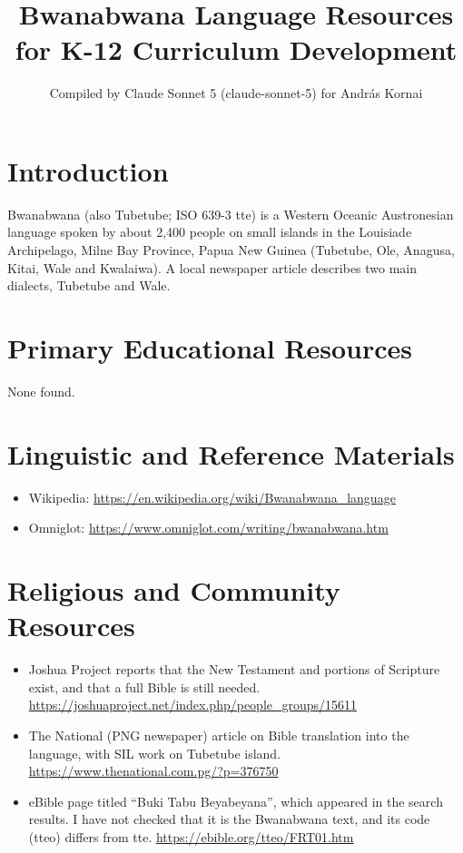 \documentclass[12pt]{article}
\title{Bwanabwana Language Resources for K-12 Curriculum Development}
\author{Compiled by Claude Sonnet 5 (claude-sonnet-5) for Andr\'as Kornai}
\date{}
\begin{document}
\maketitle

\section{Introduction}
Bwanabwana (also Tubetube; ISO 639-3 tte) is a Western Oceanic Austronesian language spoken by about 2,400 people on small islands in the Louisiade Archipelago, Milne Bay Province, Papua New Guinea (Tubetube, Ole, Anagusa, Kitai, Wale and Kwalaiwa). A local newspaper article describes two main dialects, Tubetube and Wale.

\section{Primary Educational Resources}
None found.

\section{Linguistic and Reference Materials}
\begin{itemize}
\item Wikipedia: \url{https://en.wikipedia.org/wiki/Bwanabwana_language}
\item Omniglot: \url{https://www.omniglot.com/writing/bwanabwana.htm}
\end{itemize}

\section{Religious and Community Resources}
\begin{itemize}
\item Joshua Project reports that the New Testament and portions of Scripture exist, and that a full Bible is still needed. \url{https://joshuaproject.net/index.php/people_groups/15611}
\item The National (PNG newspaper) article on Bible translation into the language, with SIL work on Tubetube island. \url{https://www.thenational.com.pg/?p=376750}
\item eBible page titled ``Buki Tabu Beyabeyana'', which appeared in the search results. I have not checked that it is the Bwanabwana text, and its code (tteo) differs from tte. \url{https://ebible.org/tteo/FRT01.htm}
\end{itemize}
\end{document}
